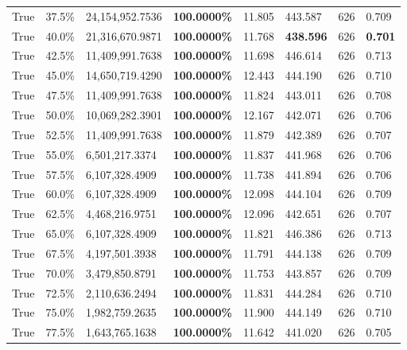 \begin{table}[H]
\begin{tabular}{lllrllll}
\cline{1-8}
True & 37.5\% & 24,154,952.7536 & \bfseries \color{red} 100.0000\% & 11.805 & 443.587 & 626 & 0.709 \\
\cline{1-8}
True & 40.0\% & 21,316,670.9871 & \bfseries \color{red} 100.0000\% & 11.768 & \bfseries \color{red} 438.596 & 626 & \bfseries \color{red} 0.701 \\
\cline{1-8}
True & 42.5\% & 11,409,991.7638 & \bfseries \color{red} 100.0000\% & 11.698 & 446.614 & 626 & 0.713 \\
\cline{1-8}
True & 45.0\% & 14,650,719.4290 & \bfseries \color{red} 100.0000\% & 12.443 & 444.190 & 626 & 0.710 \\
\cline{1-8}
True & 47.5\% & 11,409,991.7638 & \bfseries \color{red} 100.0000\% & 11.824 & 443.011 & 626 & 0.708 \\
\cline{1-8}
True & 50.0\% & 10,069,282.3901 & \bfseries \color{red} 100.0000\% & 12.167 & 442.071 & 626 & 0.706 \\
\cline{1-8}
True & 52.5\% & 11,409,991.7638 & \bfseries \color{red} 100.0000\% & 11.879 & 442.389 & 626 & 0.707 \\
\cline{1-8}
True & 55.0\% & 6,501,217.3374 & \bfseries \color{red} 100.0000\% & 11.837 & 441.968 & 626 & 0.706 \\
\cline{1-8}
True & 57.5\% & 6,107,328.4909 & \bfseries \color{red} 100.0000\% & 11.738 & 441.894 & 626 & 0.706 \\
\cline{1-8}
True & 60.0\% & 6,107,328.4909 & \bfseries \color{red} 100.0000\% & 12.098 & 444.104 & 626 & 0.709 \\
\cline{1-8}
True & 62.5\% & 4,468,216.9751 & \bfseries \color{red} 100.0000\% & 12.096 & 442.651 & 626 & 0.707 \\
\cline{1-8}
True & 65.0\% & 6,107,328.4909 & \bfseries \color{red} 100.0000\% & 11.821 & 446.386 & 626 & 0.713 \\
\cline{1-8}
True & 67.5\% & 4,197,501.3938 & \bfseries \color{red} 100.0000\% & 11.791 & 444.138 & 626 & 0.709 \\
\cline{1-8}
True & 70.0\% & 3,479,850.8791 & \bfseries \color{red} 100.0000\% & 11.753 & 443.857 & 626 & 0.709 \\
\cline{1-8}
True & 72.5\% & 2,110,636.2494 & \bfseries \color{red} 100.0000\% & 11.831 & 444.284 & 626 & 0.710 \\
\cline{1-8}
True & 75.0\% & 1,982,759.2635 & \bfseries \color{red} 100.0000\% & 11.900 & 444.149 & 626 & 0.710 \\
\cline{1-8}
True & 77.5\% & 1,643,765.1638 & \bfseries \color{red} 100.0000\% & 11.642 & 441.020 & 626 & 0.705 \\

\end{tabular}
\end{table}
